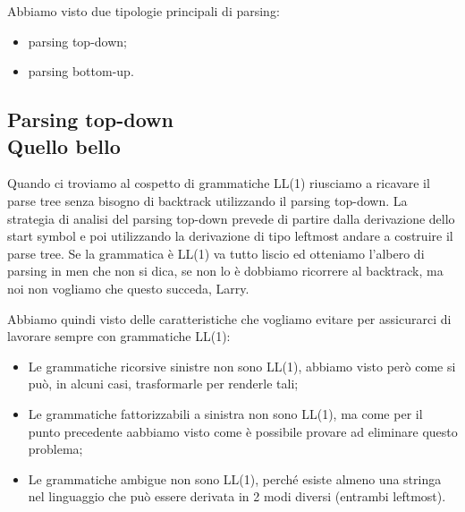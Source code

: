 \documentclass[class=book, crop=false, oneside, 12pt]{standalone}
\begin{document}
Abbiamo visto due tipologie principali di parsing:
\begin{itemize}
    \item parsing top-down;
    \item parsing bottom-up.
\end{itemize} 

\subsection{Parsing top-down\\ \small{Quello bello}}
Quando ci troviamo al cospetto di grammatiche LL(1) riusciamo a ricavare il parse tree senza bisogno di backtrack utilizzando il parsing top-down.
La strategia di analisi del parsing top-down prevede di partire dalla derivazione dello start symbol e poi utilizzando la derivazione di tipo leftmost andare a costruire il parse tree.
Se la grammatica è LL(1) va tutto liscio ed otteniamo l'albero di parsing in men che non si dica, se non lo è dobbiamo ricorrere al backtrack, ma noi non vogliamo che questo succeda, Larry.

Abbiamo quindi visto delle caratteristiche che vogliamo evitare per assicurarci di lavorare sempre con grammatiche LL(1):
\begin{itemize}
    \item Le grammatiche ricorsive sinistre non sono LL(1), abbiamo visto però come si può, in alcuni casi, trasformarle per renderle tali;
    \item Le grammatiche fattorizzabili a sinistra non sono LL(1), ma come per il punto precedente aabbiamo visto come è possibile provare ad eliminare questo problema;
    \item Le grammatiche ambigue non sono LL(1), perché esiste almeno una stringa nel linguaggio che può essere derivata in 2 modi diversi (entrambi leftmost).
\end{itemize}
\end{document}
